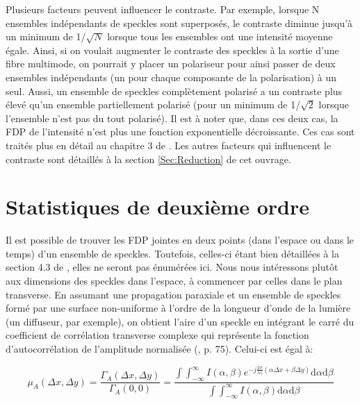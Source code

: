 \documentclass{article}       %
\begin{document}
Plusieurs facteurs peuvent influencer le contraste. Par exemple, lorsque N ensembles indépendants de speckles sont superposés, le contraste diminue jusqu'à un minimum de 1/$\sqrt{N}$ lorsque tous les ensembles ont une intensité moyenne égale. Ainsi, si on voulait augmenter le contraste des speckles à la sortie d'une fibre multimode, on pourrait y placer un polariseur pour ainsi passer de deux ensembles indépendants (un pour chaque composante de la polarisation) à un seul. Aussi, un ensemble de speckles complètement polarisé a un contraste plus élevé qu'un ensemble partiellement polarisé (pour un minimum de 1/$\sqrt{2}$ lorsque l'ensemble n'est pas du tout polarisé). Il est à noter que, dans ces deux cas, la FDP de l'intensité n'est plus une fonction exponentielle décroissante. Ces cas sont traités plus en détail au chapitre 3 de \cite{Manuel}. Les autres facteurs qui influencent le contraste sont détaillés à la section \ref{Sec:Reduction} de cet ouvrage.\\

\bigskip





\section{Statistiques de deuxième ordre}
\label{méthodes_expérimentales}

Il est possible de trouver les FDP jointes en deux points (dans l'espace ou dans le temps) d'un ensemble de speckles. Toutefois, celles-ci étant bien détaillées à la section 4.3 de \cite{Manuel}, elles ne seront pas énumérées ici. Nous nous intéressons plutôt aux dimensions des speckles dans l'espace, à commencer par celles dans le plan transverse. En assumant une propagation paraxiale et un ensemble de speckles formé par une surface non-uniforme à l'ordre de la longueur d'onde de la lumière (un diffuseur, par exemple), on obtient l'aire d'un speckle en intégrant le carré du coefficient de corrélation transverse complexe qui représente la fonction d'autocorrélation de l'amplitude normalisée (\cite{Manuel}, p. 75). Celui-ci est égal à:

\begin{equation}
\label{Eq:CoeffCorrel}
    \mu_{A}(\Delta x, \Delta y) = \frac{\Gamma_{A}(\Delta x, \Delta y)}{\Gamma_{A}(0,0)} = \frac{\int\int_{-\infty}^{\infty}I(\alpha, \beta)e^{-j\frac{2\pi}{\lambda z}(\alpha \Delta x + \beta \Delta y)}\text{d}\alpha\text{d}\beta}{\int\int_{-\infty}^{\infty}I(\alpha, \beta)\text{d}\alpha\text{d}\beta}
\end{equation}
\end{document}

